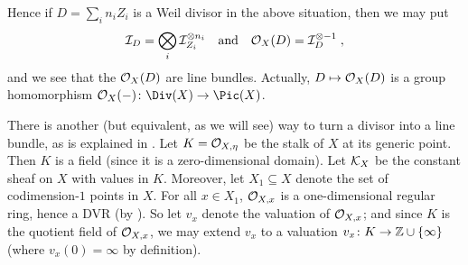 \documentclass[a4paper,parskip=half,numbers=enddot, DIV=12]{scrreprt}
\begin{document}
Hence if $D=\sum_in_iZ_i$ is a Weil divisor in the above situation, then we may put
\begin{align}\lbl{eq:OXD}
	\Ii_D=\bigotimes_i\Ii_{Z_i}^{\otimes n_i}\quad\text{and}\quad \Oo_X(D)=\Ii_D^{\otimes -1}\;,
\end{align}
and we see that the $\mathcal{O}_X(D)$ are line bundles. Actually, $D\mapsto \mathcal{O}_X(D)$ is a group homomorphism $\Oo_X(-)\colon \Div(X)\morphism\Pic(X)$.

There is another (but equivalent, as we will see) way to turn a divisor into a line bundle, as is explained in \cite[58]{alggeo2}. Let $K=\mathcal{O}_{X,\eta}$ be the stalk of $X$ at its generic point. Then $K$ is a field (since it is a zero-dimensional domain). Let $\mathcal{K}_X$ be the constant sheaf on $X$ with values in $K$. Moreover, let $X_1\subseteq X$ denote the set of codimension-$1$ points in $X$. For all $x\in X_1$, $\mathcal{O}_{X,x}$ is a one-dimensional regular ring, hence a DVR (by \cite[Theorem~21]{alg2}). So let $v_x$ denote the valuation of $\mathcal{O}_{X,x}$; and since $K$ is the quotient field of $\mathcal{O}_{X,x}$, we may extend $v_x$ to a valuation $v_x\colon K\morphism\IZ\cup\{\infty\}$ (where $v_x(0)=\infty$ by definition).
\end{document}
